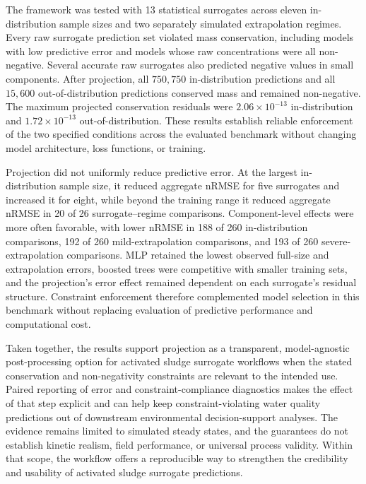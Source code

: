 \documentclass[a4paper,fleqn]{cas-sc}
\begin{document}
The framework was tested with 13 statistical surrogates across eleven in-distribution sample sizes and two separately simulated extrapolation regimes. Every raw surrogate prediction set violated mass conservation, including models with low predictive error and models whose raw concentrations were all non-negative. Several accurate raw surrogates also predicted negative values in small components. After projection, all $750{,}750$ in-distribution predictions and all $15{,}600$ out-of-distribution predictions conserved mass and remained non-negative. The maximum projected conservation residuals were $2.06\times10^{-13}$ in-distribution and $1.72\times10^{-13}$ out-of-distribution. These results establish reliable enforcement of the two specified conditions across the evaluated benchmark without changing model architecture, loss functions, or training.

Projection did not uniformly reduce predictive error. At the largest in-distribution sample size, it reduced aggregate nRMSE for five surrogates and increased it for eight, while beyond the training range it reduced aggregate nRMSE in 20 of 26 surrogate--regime comparisons. Component-level effects were more often favorable, with lower nRMSE in 188 of 260 in-distribution comparisons, 192 of 260 mild-extrapolation comparisons, and 193 of 260 severe-extrapolation comparisons. MLP retained the lowest observed full-size and extrapolation errors, boosted trees were competitive with smaller training sets, and the projection's error effect remained dependent on each surrogate's residual structure. Constraint enforcement therefore complemented model selection in this benchmark without replacing evaluation of predictive performance and computational cost.

Taken together, the results support projection as a transparent, model-agnostic post-processing option for activated sludge surrogate workflows when the stated conservation and non-negativity constraints are relevant to the intended use. Paired reporting of error and constraint-compliance diagnostics makes the effect of that step explicit and can help keep constraint-violating water quality predictions out of downstream environmental decision-support analyses. The evidence remains limited to simulated steady states, and the guarantees do not establish kinetic realism, field performance, or universal process validity. Within that scope, the workflow offers a reproducible way to strengthen the credibility and usability of activated sludge surrogate predictions.
\end{document}
